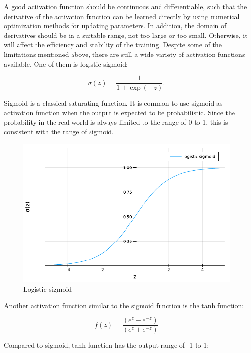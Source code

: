 \documentclass[
	parskip, 			   %
	twoside, 			   %
	DIV=14, 			   %
	BCOR=15.0mm, 		   %
	headsepline, 		   %
	open=right, 		   %
	captions=tableheading, %
	bibliography=totoc,    %
	numbers=noenddot       %
]{scrreprt}
\begin{document}
A good activation function should be continuous and differentiable, such that the derivative of the activation function can be learned directly by using numerical optimization methods for updating parameters. In addition, the domain of derivatives should be in a suitable range, not too large or too small. Otherwise, it will affect the efficiency and stability of the training. Despite some of the limitations mentioned above, there are still a wide variety of activation functions available. One of them is logistic sigmoid:

\begin{equation}
    \label{eq:sigmoid}
    \sigma(z)=\frac{1}{1+\exp (-z)}.
\end{equation}

Sigmoid is a classical saturating function. It is common to use sigmoid as activation function when the output is expected to be probabilistic. Since the probability in the real world is always limited to the range of 0 to 1, this is consistent with the range of sigmoid.

\begin{figure}[h!]
    \centering
    \includegraphics[scale=0.7]{figures/sigmoid.pdf}
    \caption{Logistic sigmoid}
    \label{fig:sigmoid}
\end{figure}

Another activation function similar to the sigmoid function is the tanh function:

\begin{equation}
    \label{eq:tanh}
    f(z)=\frac{\left(e^{z}-e^{-z}\right)}{\left(e^{z}+e^{-z}\right)}
\end{equation}

Compared to sigmoid, tanh function has the output range of -1 to 1:
\end{document}
